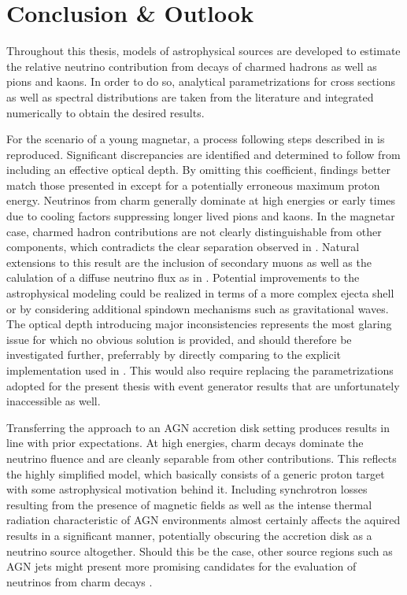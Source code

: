 \chapter{Conclusion \& Outlook}
\label{ch:conclusion}

\begin{spacing}{0.995}
	Throughout this thesis, models of astrophysical sources are developed to estimate the relative neutrino contribution from
	decays of charmed hadrons as well as pions and kaons. In order to do so, analytical parametrizations for cross sections as well as
	spectral distributions are taken from the literature and integrated numerically to obtain the desired results.

	For the scenario of a young magnetar, a process following steps described in \cite{Carpio_2020} is reproduced. Significant
	discrepancies are identified and determined to follow from including an effective optical depth. By omitting this coefficient,
	findings better match those presented in \cite{Carpio_2020} except for a potentially erroneous maximum proton energy. Neutrinos
	from charm generally dominate at high energies or early times due to cooling factors suppressing longer lived pions and kaons.
	In the magnetar case, charmed hadron contributions are not clearly distinguishable from other components, which contradicts
	the clear separation observed in \cite{Carpio_2020}. Natural extensions to this result are the inclusion of secondary muons as
	well as the calulation of a diffuse neutrino flux as in \cite{Carpio_2020}. Potential improvements to the astrophysical modeling
	could be realized in terms of a more complex ejecta shell or by considering additional spindown mechanisms such as gravitational
	waves. The optical depth introducing major inconsistencies represents the most glaring issue for which no obvious solution is
	provided, and should therefore be investigated further, preferrably by directly comparing to the explicit implementation used in
	\cite{Carpio_2020}. This would also require replacing the parametrizations adopted for the present thesis with event generator
	results that are unfortunately inaccessible as well.

	Transferring the approach to an AGN accretion disk setting produces results in line with prior expectations. At high energies,
	charm decays dominate the neutrino fluence and are cleanly separable from other contributions. This reflects the highly simplified
	model, which basically consists of a generic proton target with some astrophysical motivation behind it. Including synchrotron
	losses resulting from the presence of magnetic fields as well as the intense thermal radiation characteristic of AGN environments
	almost certainly affects the aquired results in a significant manner, potentially obscuring the accretion disk as a neutrino source
	altogether. Should this be the case, other source regions such as AGN jets might present more promising candidates for the
	evaluation of neutrinos from charm decays \cite{Murase_2023}.


\end{spacing}
